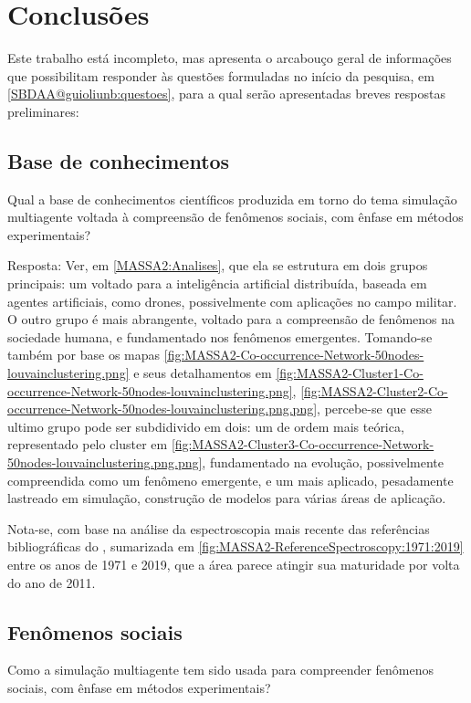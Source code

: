 \section{Conclusões}

Este trabalho está incompleto, mas apresenta o arcabouço geral de informações que possibilitam responder às  questões formuladas no início da pesquisa, em \ref{SBDAA@guioliunb:questoes}, para a qual serão apresentadas breves respostas preliminares:

\subsection{Base de conhecimentos}

Qual a base de conhecimentos científicos produzida em torno do tema simulação multiagente voltada à compreensão de fenômenos sociais, com ênfase em métodos experimentais?
 
Resposta: Ver, em \ref{MASSA2:Analises}, que ela se estrutura em dois grupos principais: um voltado para a inteligência artificial distribuída, baseada em agentes artificiais, como drones, possivelmente com aplicações no campo militar.
O outro grupo é mais abrangente, voltado para a compreensão de fenômenos na sociedade humana, e fundamentado
nos fenômenos emergentes.
Tomando-se também por base os mapas \ref{fig:MASSA2-Co-occurrence-Network-50nodes-louvainclustering.png} e seus detalhamentos em \ref{fig:MASSA2-Cluster1-Co-occurrence-Network-50nodes-louvainclustering.png}, \ref{fig:MASSA2-Cluster2-Co-occurrence-Network-50nodes-louvainclustering.png.png}, percebe-se que esse ultimo grupo pode ser subdidivido em dois: um de ordem mais teórica, representado pelo cluster em \ref{fig:MASSA2-Cluster3-Co-occurrence-Network-50nodes-louvainclustering.png.png}, fundamentado na evolução, possivelmente compreendida como um fenômeno emergente, e um mais aplicado, pesadamente lastreado em simulação, construção de modelos para várias áreas de aplicação.

Nota-se, com base na análise da espectroscopia mais recente das referências bibliográficas do \dataset, sumarizada em \ref{fig:MASSA2-ReferenceSpectroscopy:1971:2019} entre os anos de 1971 e 2019, que a área parece atingir sua maturidade por volta do ano de 2011.

\subsection{Fenômenos sociais}
   
Como a simulação multiagente tem sido usada para compreender fenômenos sociais, com ênfase em métodos experimentais? 

